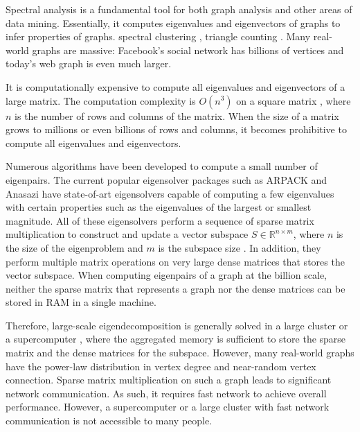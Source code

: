 Spectral analysis \cite{} is a fundamental tool for both graph analysis and
other areas of data mining. Essentially, it computes
eigenvalues and eigenvectors of graphs to infer properties of graphs.
spectral clustering \cite{Ng01, Sussman12}, triangle counting \cite{Tsourakakis08}.
Many real-world graphs are massive: Facebook's social network has billions
of vertices and today's web graph is even much larger.


It is computationally expensive to compute all eigenvalues and
eigenvectors of a large matrix. The computation complexity is
$O(n^3)$ on a square matrix \cite{Pan99}, where $n$ is the number of rows
and columns of the matrix.
When the size of a matrix grows to millions or even billions of rows and
columns, it becomes prohibitive to compute all eigenvalues and
eigenvectors.

Numerous algorithms \cite{Lanczos, IRLM, krylovschur, Arbenz05} have been
developed to compute a small number of eigenpairs.
The current popular eigensolver packages such as ARPACK \cite{arpack}
and Anasazi \cite{anasazi} have state-of-art eigensolvers
capable of computing a few eigenvalues with certain properties such as
the eigenvalues of the largest or smallest magnitude. All of these eigensolvers
perform a sequence of sparse matrix multiplication to construct and update
a vector subspace $S \in \mathbb{R}^{n \times m}$, where $n$ is the size of
the eigenproblem and $m$ is the subspace size \cite{Arbenz05}. In addition,
they perform multiple matrix operations on very large dense matrices that
stores the vector subspace. When computing eigenpairs of a graph
at the billion scale, neither the sparse matrix that represents a graph nor
the dense matrices can be stored in RAM in a single machine.

Therefore, large-scale eigendecomposition is generally solved in a large cluster
or a supercomputer \cite{anasazi, slepc}, where the aggregated memory is
sufficient to store the sparse matrix and the dense matrices for
the subspace. However, many real-world graphs have the power-law distribution
in vertex degree and near-random vertex connection. Sparse matrix multiplication
on such a graph leads to significant network communication. As such, it requires
fast network to achieve overall performance. However, a supercomputer or a large
cluster with fast network communication is not accessible to many people.

